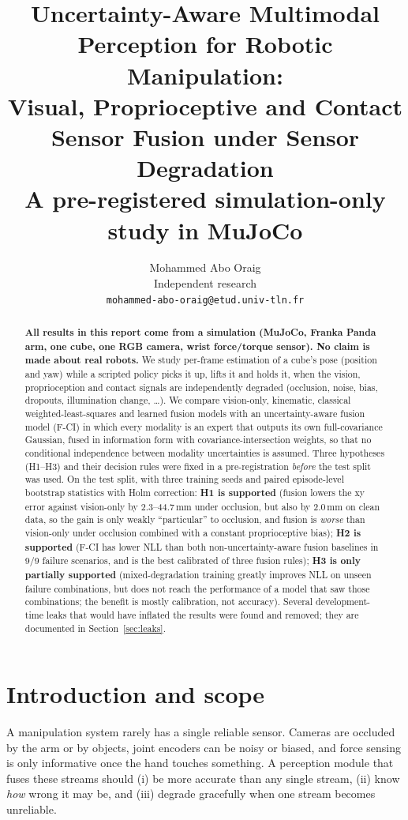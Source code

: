 \documentclass[11pt,a4paper]{article}
\title{
    \LARGE\textbf{Uncertainty-Aware Multimodal Perception for Robotic Manipulation:}\\[4pt]
    \large\textbf{Visual, Proprioceptive and Contact Sensor Fusion under Sensor Degradation}\\[8pt]
    \large A pre-registered simulation-only study in MuJoCo
}
\author{
    Mohammed Abo Oraig\\
    \small Independent research\\
    \small\texttt{mohammed-abo-oraig@etud.univ-tln.fr}
}
\date{}
\begin{document}
\maketitle

\begin{abstract}
\noindent\textbf{All results in this report come from a simulation (MuJoCo, Franka Panda arm, one cube, one RGB camera, wrist force/torque sensor). No claim is made about real robots.}
We study per-frame estimation of a cube's pose (position and yaw) while a scripted policy picks it up, lifts it and holds it, when the vision, proprioception and contact signals are independently degraded (occlusion, noise, bias, dropouts, illumination change, \dots).
We compare vision-only, kinematic, classical weighted-least-squares and learned fusion models with an uncertainty-aware fusion model (F-CI) in which every modality is an expert that outputs its own full-covariance Gaussian, fused in information form with covariance-intersection weights, so that no conditional independence between modality uncertainties is assumed.
Three hypotheses (H1--H3) and their decision rules were fixed in a pre-registration \emph{before} the test split was used.
On the test split, with three training seeds and paired episode-level bootstrap statistics with Holm correction:
\textbf{H1 is supported} (fusion lowers the xy error against vision-only by 2.3--44.7\,mm under occlusion, but also by 2.0\,mm on clean data, so the gain is only weakly ``particular'' to occlusion, and fusion is \emph{worse} than vision-only under occlusion combined with a constant proprioceptive bias);
\textbf{H2 is supported} (F-CI has lower NLL than both non-uncertainty-aware fusion baselines in 9/9 failure scenarios, and is the best calibrated of three fusion rules);
\textbf{H3 is only partially supported} (mixed-degradation training greatly improves NLL on unseen failure combinations, but does not reach the performance of a model that saw those combinations; the benefit is mostly calibration, not accuracy).
Several development-time leaks that would have inflated the results were found and removed; they are documented in Section~\ref{sec:leaks}.
\end{abstract}

\tableofcontents
\clearpage

\section{Introduction and scope}
A manipulation system rarely has a single reliable sensor. Cameras are occluded by the arm or by objects, joint encoders can be noisy or biased, and force sensing is only informative once the hand touches something. A perception module that fuses these streams should (i) be more accurate than any single stream, (ii) know \emph{how} wrong it may be, and (iii) degrade gracefully when one stream becomes unreliable.
\end{document}
